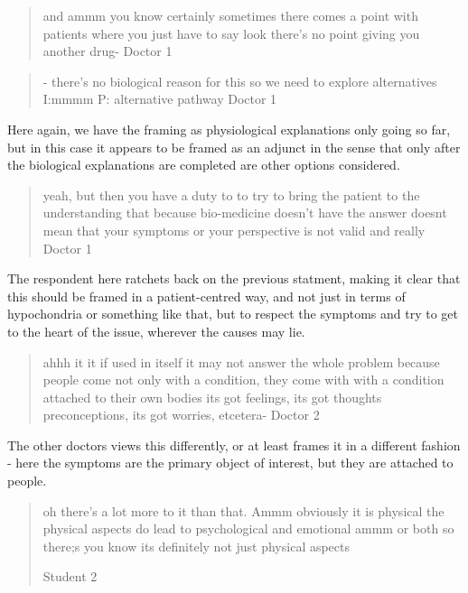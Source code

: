 \begin{quotation}
and ammm you know certainly sometimes there comes a point with patients where you just have to say look there's no point giving you another drug-
Doctor 1  
\end{quotation}



\begin{quotation}
  - there's no biological reason for this so we need to explore alternatives 
I:mmmm
P: alternative pathway
Doctor 1
\end{quotation}

Here again, we have the framing as physiological explanations only going so far, but in this case it appears to be framed as an adjunct in the sense that only after the biological explanations are completed are other options considered. 

\begin{quotation}
  yeah, but then you have a duty to to try to bring the patient to the understanding that because bio-medicine doesn't have the answer doesnt mean that your symptoms or your perspective is not valid and really 
Doctor 1
\end{quotation}


The respondent here ratchets back on the previous statment, making it clear that this should be framed in a patient-centred way, and not just in terms of hypochondria or something like that, but to respect the symptoms and try to get to the heart of the issue, wherever the causes may lie. 

\begin{quotation}
  ahhh it it if used in itself it may not answer the whole problem because people come not only with a condition, they come with with a condition attached to their own bodies its got feelings, its got thoughts preconceptions, its got worries, etcetera-
Doctor 2
\end{quotation}


The other doctors views this differently, or at least frames it in a different fashion - here the symptoms are the primary object of interest, but they are attached to people. 

\begin{quotation}
  oh there's a lot more to it than that. Ammm obviously it is physical the physical aspects do lead to psychological and emotional ammm or both so there;s you know its definitely not just physical aspects 

Student 2
\end{quotation}

